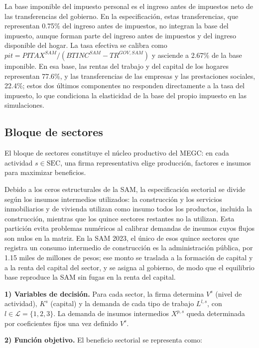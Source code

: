 \documentclass[11pt]{article}
\begin{document}
La base imponible del impuesto personal es el ingreso antes de impuestos neto de las transferencias del gobierno. En la especificación, estas transferencias, que representan 0.75\% del ingreso antes de impuestos, no integran la base del impuesto, aunque forman parte del ingreso antes de impuestos y del ingreso disponible del hogar. La tasa efectiva se calibra como $pit=PITAX^{SAM}/\left(BTINC^{SAM}-TR^{GOV,SAM}\right)$ y asciende a 2.67\% de la base imponible. En esa base, las rentas del trabajo y del capital de los hogares representan 77.6\%, y las transferencias de las empresas y las prestaciones sociales, 22.4\%; estos dos últimos componentes no responden directamente a la tasa del impuesto, lo que condiciona la elasticidad de la base del propio impuesto en las simulaciones.

\subsection{Bloque de sectores}

El bloque de sectores constituye el núcleo productivo del MEGC: en cada actividad $s \in \mathrm{SEC}$, una firma representativa elige producción, factores e insumos para maximizar beneficios.

Debido a los ceros estructurales de la SAM, la especificación sectorial se divide según los insumos intermedios utilizados: la construcción y los servicios inmobiliarios y de vivienda utilizan como insumo todos los productos, incluida la construcción, mientras que los quince sectores restantes no la utilizan. Esta partición evita problemas numéricos al calibrar demandas de insumos cuyos flujos son nulos en la matriz. En la SAM 2023, el único de esos quince sectores que registra un consumo intermedio de construcción es la administración pública, por 1.15 miles de millones de pesos; ese monto se traslada a la formación de capital y a la renta del capital del sector, y se asigna al gobierno, de modo que el equilibrio base reproduce la SAM sin fugas en la renta del capital.

\textbf{1) Variables de decisión.} Para cada sector, la firma determina \(V^{s}\) (nivel de actividad), \(K^{s}\) (capital) y la demanda de cada tipo de trabajo \(L^{l,s}\), con \(l \in \mathcal{L}=\{1,2,3\}\). La demanda de insumos intermedios \(X^{p,s}\) queda determinada por coeficientes fijos una vez definido \(V^{s}\).

\textbf{2) Función objetivo.} El beneficio sectorial se representa como:
\end{document}
